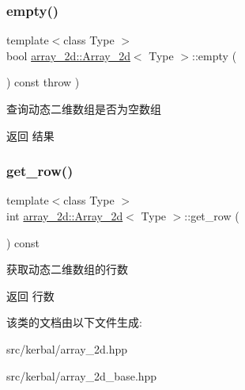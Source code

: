 \subsubsection{\texorpdfstring{empty()}{empty()}}
{\footnotesize\ttfamily template$<$class Type $>$ \\
bool \hyperlink{classarray__2d_1_1_array__2d}{array\+\_\+2d\+::\+Array\+\_\+2d}$<$ Type $>$\+::empty (\begin{DoxyParamCaption}{ }\end{DoxyParamCaption}) const throw  ) }



查询动态二维数组是否为空数组 

\begin{DoxyReturn}{返回}
结果 
\end{DoxyReturn}
\mbox{\label{classarray__2d_1_1_array__2d_aa2ac561244188718d0c1ee14568b772e}} 
\subsubsection{\texorpdfstring{get\+\_\+row()}{get\_row()}}
{\footnotesize\ttfamily template$<$class Type $>$ \\
int \hyperlink{classarray__2d_1_1_array__2d}{array\+\_\+2d\+::\+Array\+\_\+2d}$<$ Type $>$\+::get\+\_\+row (\begin{DoxyParamCaption}{ }\end{DoxyParamCaption}) const\hspace{0.3cm}{\ttfamily [inline]}}



获取动态二维数组的行数 

\begin{DoxyReturn}{返回}
行数 
\end{DoxyReturn}


该类的文档由以下文件生成\+:\begin{DoxyCompactItemize}
\item 
src/kerbal/array\+\_\+2d.\+hpp\item 
src/kerbal/array\+\_\+2d\+\_\+base.\+hpp\end{DoxyCompactItemize}
